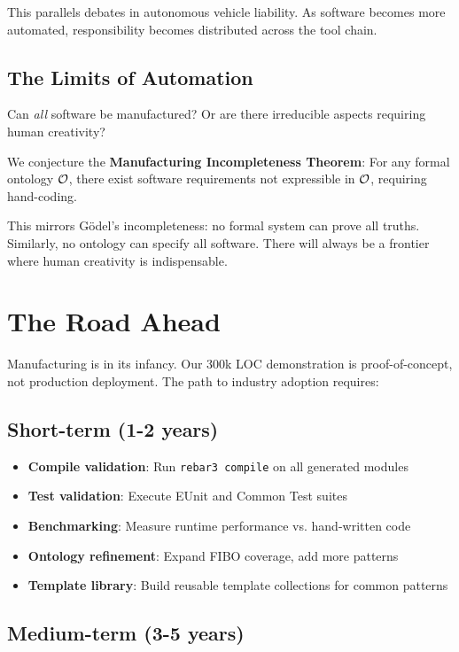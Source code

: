 This parallels debates in autonomous vehicle liability. As software becomes more automated, responsibility becomes distributed across the tool chain.

\subsection{The Limits of Automation}

Can \textit{all} software be manufactured? Or are there irreducible aspects requiring human creativity?

We conjecture the \textbf{Manufacturing Incompleteness Theorem}: For any formal ontology $\mathcal{O}$, there exist software requirements not expressible in $\mathcal{O}$, requiring hand-coding.

This mirrors Gödel's incompleteness: no formal system can prove all truths. Similarly, no ontology can specify all software. There will always be a frontier where human creativity is indispensable.

\section{The Road Ahead}

Manufacturing is in its infancy. Our 300k LOC demonstration is proof-of-concept, not production deployment. The path to industry adoption requires:

\subsection{Short-term (1-2 years)}

\begin{itemize}
    \item \textbf{Compile validation}: Run \texttt{rebar3 compile} on all generated modules
    \item \textbf{Test validation}: Execute EUnit and Common Test suites
    \item \textbf{Benchmarking}: Measure runtime performance vs. hand-written code
    \item \textbf{Ontology refinement}: Expand FIBO coverage, add more patterns
    \item \textbf{Template library}: Build reusable template collections for common patterns
\end{itemize}

\subsection{Medium-term (3-5 years)}

